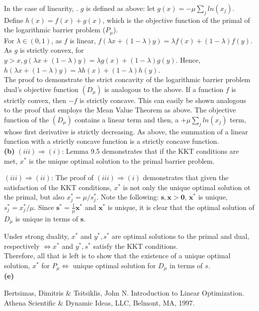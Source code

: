 \documentclass{article}
\begin{document}
\noindent
In the case of linearity, .
$g$ is defined as above:  let $g(x) = - \mu \sum_j ln(x_j)$.  Define $h(x) = f(x) + g(x)$, which is the objective function of the primal of the logarithmic barrier problem ($P_\mu$).  \\

\noindent
For $\lambda \in (0,1)$, as $f$ is linear, $f(\lambda x + (1-\lambda) y) = \lambda f(x) + (1-\lambda) f(y)$.  As $g$ is strictly convex, for $y > x, g(\lambda x + (1-\lambda) y) = \lambda g(x) + (1-\lambda) g(y)$.  Hence, $h(\lambda x + (1-\lambda) y) = \lambda h(x) + (1-\lambda) h(y)$. \\

\noindent 
The proof to demonstrate the strict concavity of the logarithmic barrier problem dual's objective function $(D_\mu)$ is analogous to the above.  If a function $f$ is strictly convex, then $-f$ is strictly concave.  This can easily be shown analogous to the proof that employs the Mean Value Theorem as above.  The objective function of the $(D_\mu)$ contains a linear term and then, a $+ \mu \sum_j ln(x_j)$ term, whose first derivative is strictly decreasing.  As above, the summation of a linear function with a strictly concave function is a strictly concave function. \\

\noindent
\textbf{(b)}
$(iii) \Rightarrow (i)$:  Lemma 9.5\cite{BT} demonstrates that if the KKT conditions are met, $x^*$ is the unique optimal solution to the primal barrier problem.  

$(iii) \Rightarrow (ii)$:  The proof of $(iii) \Rightarrow (i)$ demonstrates that  given the satisfaction of the KKT conditions, $x^*$ is not only the unique optimal solution ot the primal, but also $x^*_j = \mu/s_j^*$.  Note the following:  $\mathbf{s,x > 0}$, $\mathbf{x^*}$ is unique, $s_j^* = x_j^*/\mu$.  Since $\mathbf{s^*} = \frac{1}{\mu} \mathbf{x^*}$ and $\mathbf{x^*}$ is unique, it is clear that the optimal solution of $D_\mu$ is unique in terms of $\mathbf{s}$.  

Under strong duality, $x^*$ and $y^*, s^*$  are optimal solutions to the primal and dual, respectively $\Leftrightarrow x^*$ and $y^*, s^*$ satisfy the KKT conditions. \\
Therefore, all that is left is to show that the existence of a unique optimal solution, $x^*$ for $P_\mu \Leftrightarrow$ unique optimal solution for $D_\mu$ in terms of $s$.  \\



\textbf{(e)}
\begin{thebibliography}{9}

Bertsimas, Dimitris \& Tsitsiklis, John N.  Introduction to Linear Optimization.  Athena Scientific \& Dynamic Ideas, LLC, Belmont, MA, 1997. 

\end{thebibliography}
\end{document}
